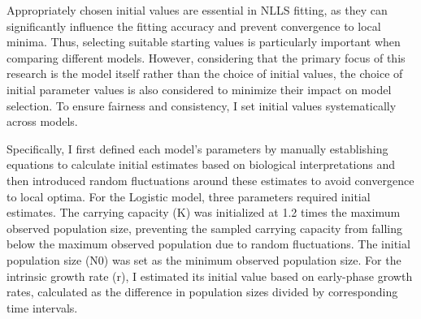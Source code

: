 \documentclass{article}
\begin{document}
Appropriately chosen initial values are essential in NLLS fitting, as they can significantly influence the fitting accuracy and prevent convergence to local minima. Thus, selecting suitable starting values is particularly important when comparing different models.\cite{zwietering1990modeling} However, considering that the primary focus of this research is the model itself rather than the choice of initial values, the choice of initial parameter values is also considered to minimize their impact on model selection. To ensure fairness and consistency, I set initial values systematically across models.

Specifically, I first defined each model’s parameters by manually establishing equations to calculate initial estimates based on biological interpretations and then introduced random fluctuations around these estimates to avoid convergence to local optima. For the Logistic model, three parameters required initial estimates. The carrying capacity (K) was initialized at 1.2 times the maximum observed population size, preventing the sampled carrying capacity from falling below the maximum observed population due to random fluctuations. The initial population size (N0) was set as the minimum observed population size. For the intrinsic growth rate (r), I estimated its initial value based on early-phase growth rates, calculated as the difference in population sizes divided by corresponding time intervals.
\end{document}
